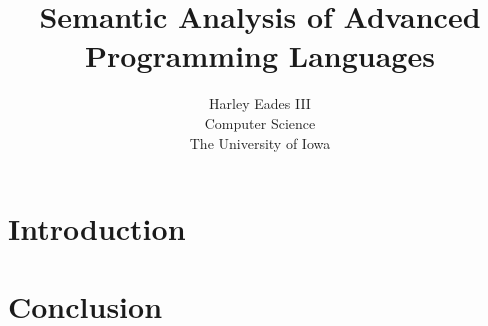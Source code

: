 \usepackage{amsmath,amssymb,amsthm,amstext}
\usepackage{mathpartir}
\usepackage{vmargin}
\usepackage{enumitem}
\usepackage{url}
\usepackage{todonotes}
\usepackage{listings}
\usepackage{stmaryrd} 
\usepackage{graphicx}
\usepackage{tikz}
\usepackage{hyperref}
\usetikzlibrary{arrows}
\usetikzlibrary{shapes}

\newtheorem{theorem}{Theorem}
\newtheorem{lemma}[theorem]{Lemma}
\newtheorem{corollary}[theorem]{Corollary}
\newtheorem{definition}[theorem]{Definition}
\newtheorem{proposition}[theorem]{Proposition}
\newtheorem{example}[theorem]{Example}

\newcommand{\redto}[0]{\rightsquigarrow}
\newcommand{\interp}[1]{\llbracket #1 \rrbracket}
\newcommand{\ifrName}[1]{#1}

\newcommand{\chcalc}[0]{\bar{\lambda}\mu\tilde{\mu}}

\newcommand{\cse}[0]{\noindent\underline{\textbf{Case:}}\ }

\usepackage{supertabular}



\newcommand{\ndto}[1]{\to_{#1}}
\newcommand{\ndwedge}[1]{\wedge_{#1}}

\newcommand{\To}[0]{\Rightarrow}



\title{Semantic Analysis of Advanced Programming Languages}

\author{Harley Eades III\\ Computer Science\\ The University of Iowa}

\date{}

\maketitle

\section{Introduction}
\label{sec:introduction}



\section{Conclusion}
\label{sec:conclusion}





\nocite{*}
